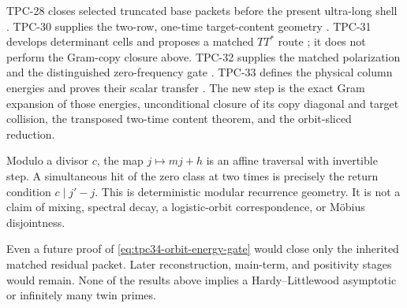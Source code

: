 TPC-28 closes selected truncated base packets before the present
ultra-long shell \citep{WangTPC28}.  TPC-30 supplies the two-row,
one-time target-content geometry \citep{WangTPC30}.  TPC-31 develops
determinant cells and proposes a matched \(TT^*\) route
\citep{WangTPC31}; it does not perform the Gram-copy closure above.
TPC-32 supplies the matched polarization and the distinguished
zero-frequency gate \citep{WangTPC32}.  TPC-33 defines the physical
column energies and proves their scalar transfer
\citep{WangTPC33}.  The new step is the exact Gram expansion of those
energies, unconditional closure of its copy diagonal and target
collision, the transposed two-time content theorem, and the
orbit-sliced reduction.

Modulo a divisor \(c\), the map \(j\mapsto mj+h\) is an affine traversal
with invertible step.  A simultaneous hit of the zero class at two times
is precisely the return condition \(c\mid j'-j\).  This is deterministic
modular recurrence geometry.  It is not a claim of mixing, spectral
decay, a logistic-orbit correspondence, or M\"obius disjointness.

Even a future proof of \eqref{eq:tpc34-orbit-energy-gate} would close only
the inherited matched residual packet.  Later reconstruction, main-term,
and positivity stages would remain.  None of the results above implies a
Hardy--Littlewood asymptotic or infinitely many twin primes.
